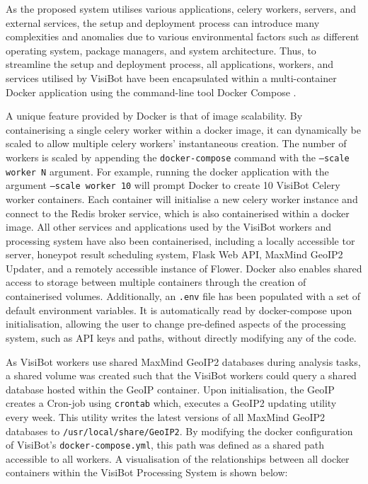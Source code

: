As the proposed system utilises various applications, celery workers, servers, and external services, the setup and deployment process can introduce many complexities and anomalies due to various environmental factors such as different operating system, package managers, and system architecture. Thus, to streamline the setup and deployment process, all applications, workers, and services utilised by VisiBot have been encapsulated within a multi-container Docker application using the command-line tool Docker Compose \citep{DockerCompose}. 

A unique feature provided by Docker is that of image scalability. By containerising a single celery worker within a docker image, it can dynamically be scaled to allow multiple celery workers' instantaneous creation. The number of workers is scaled by appending the \texttt{docker-compose} command with the \texttt{--scale worker N} argument. For example, running the docker application with the argument \texttt{--scale worker 10} will prompt Docker to create 10 VisiBot Celery worker containers. Each container will initialise a new celery worker instance and connect to the Redis broker service, which is also containerised within a docker image. All other services and applications used by the VisiBot workers and processing system have also been containerised, including a locally accessible tor server, honeypot result scheduling system, Flask Web API, MaxMind GeoIP2 Updater, and a remotely accessible instance of Flower. Docker also enables shared access to storage between multiple containers through the creation of containerised volumes. Additionally, an \texttt{.env} file has been populated with a set of default environment variables. It is automatically read by docker-compose upon initialisation, allowing the user to change pre-defined aspects of the processing system, such as API keys and paths, without directly modifying any of the code.

As VisiBot workers use shared MaxMind GeoIP2 databases \citep{MaxMind} during analysis tasks, a shared volume was created such that the VisiBot workers could query a shared database hosted within the GeoIP container. Upon initialisation, the GeoIP creates a Cron-job using \texttt{crontab} \citep{Crontab} which, executes a GeoIP2 updating utility every week. This utility writes the latest versions of all MaxMind GeoIP2 databases to \texttt{/usr/local/share/GeoIP2}. By modifying the docker configuration of VisiBot's \texttt{docker-compose.yml}, this path was defined as a shared path accessible to all workers. A visualisation of the relationships between all docker containers within the VisiBot Processing System is shown below:


